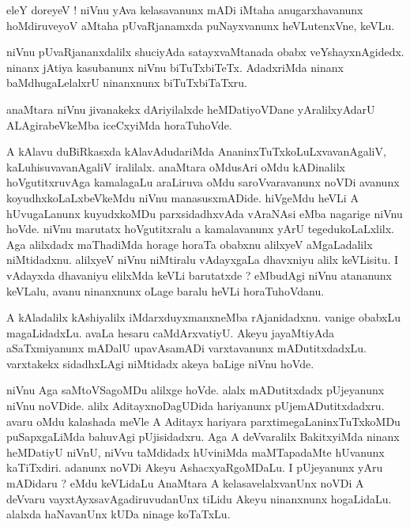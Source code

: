 \documentclass{article}
\begin{document}
\begin{mn}%
eleY doreyeV ! niVnu yAva kelasavanunx mADi iMtaha anugarxhavanunx hoMdiruveyoV aMtaha 
pUvaRjanamxda puNayxvanunx heVLutenxVne, keVLu.
\end{mn}

\begin{mn}%
niVnu pUvaRjananxdalilx shuciyAda satayxvaMtanada obabx veYshayxnAgidedx. ninanx jAtiya kasubanunx 
niVnu biTuTxbiTeTx. AdadxriMda ninanx baMdhugaLelalxrU ninanxnunx biTuTxbiTaTxru.
\end{mn}

\begin{mn}%
anaMtara niVnu jivanakekx dAriyilalxde heMDatiyoVDane yAralilxyAdarU ALAgirabeVkeMba iceCxyiMda 
horaTuhoVde.
\end{mn}

\begin{mn}%
A kAlavu duBiRkasxda kAlavAdudariMda AnaninxTuTxkoLuLxvavanAgaliV, kaLuhisuvavanAgaliV iralilalx. 
anaMtara oMdusAri oMdu kADinalilx hoVgutitxruvAga kamalagaLu araLiruva oMdu saroVvaravanunx noVDi 
avanunx koyudhxkoLaLxbeVkeMdu niVnu manasusxmADide. hiVgeMdu heVLi A hUvugaLanunx kuyudxkoMDu 
parxsidadhxvAda vAraNAsi eMba nagarige niVnu hoVde. niVnu marutatx hoVgutitxralu a kamalavanunx 
yArU tegedukoLaLxlilx. Aga alilxdadx maThadiMda horage horaTa obabxnu alilxyeV aMgaLadalilx 
niMtidadxnu. alilxyeV niVnu niMtiralu vAdayxgaLa dhavxniyu alilx keVLisitu. I vAdayxda dhavaniyu 
elilxMda keVLi barutatxde ? eMbudAgi niVnu atananunx keVLalu, avanu ninanxnunx oLage baralu heVLi 
horaTuhoVdanu.
\end{mn}

\begin{mn}%
A kAladalilx kAshiyalilx iMdarxduyxmanxneMba rAjanidadxnu. vanige obabxLu magaLidadxLu. avaLa 
hesaru caMdArxvatiyU. Akeyu jayaMtiyAda aSaTxmiyanunx mADalU upavAsamADi varxtavanunx mADutitxdadxLu.
varxtakekx sidadhxLAgi niMtidadx akeya baLige niVnu hoVde. 
\end{mn}

\begin{mn}%
niVnu Aga saMtoVSagoMDu alilxge hoVde. alalx mADutitxdadx pUjeyanunx niVnu noVDide. alilx 
AditayxnoDagUDida hariyanunx pUjemADutitxdadxru. avaru oMdu kalashada meVle A Aditayx hariyara 
parxtimegaLaninxTuTxkoMDu puSapxgaLiMda bahuvAgi pUjisidadxru. Aga A deVvaralilx BakitxyiMda 
ninanx heMDatiyU niVnU, niVvu taMdidadx hUviniMda maMTapadaMte hUvanunx kaTiTxdiri. adanunx noVDi 
Akeyu AshacxyaRgoMDaLu. I pUjeyanunx yAru mADidaru ? eMdu keVLidaLu AnaMtara A kelasavelalxvanUnx 
noVDi A deVvaru vayxtAyxsavAgadiruvudanUnx tiLidu Akeyu ninanxnunx hogaLidaLu. alalxda haNavanUnx 
kUDa ninage koTaTxLu.
\end{mn}
\end{document}
